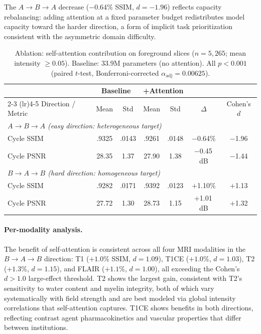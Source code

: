 \documentclass{article}
\begin{document}
The $A{\to}B{\to}A$ decrease ($-0.64\%$ SSIM, $d{=}{-}1.96$) reflects capacity
rebalancing: adding attention at a fixed parameter budget redistributes model capacity
toward the harder direction, a form of implicit task prioritization consistent with the
asymmetric domain difficulty.

\begin{table}[t]
  \centering
  \caption{Ablation: self-attention contribution on foreground slices ($n{=}5{,}265$;
    mean intensity $\geq 0.05$). Baseline: 33.9M parameters (no attention). All $p{<}0.001$
    (paired $t$-test, Bonferroni-corrected $\alpha_{\mathrm{adj}}{=}0.00625$).}
  \label{tab:ablation}
  \small
  \begin{tabular}{lcccccc}
    \toprule
    & \multicolumn{2}{c}{Baseline} & \multicolumn{2}{c}{+Attention} & & \\
    \cmidrule(lr){2-3} \cmidrule(lr){4-5}
    Direction / Metric & Mean & Std & Mean & Std & $\Delta$ & Cohen's $d$ \\
    \midrule
    \multicolumn{7}{l}{\textit{$A \to B \to A$ (easy direction: heterogeneous target)}} \\
    \quad Cycle SSIM & .9325 & .0143 & .9261 & .0148 & $-$0.64\% & $-$1.96 \\
    \quad Cycle PSNR & 28.35 & 1.37  & 27.90 & 1.38  & $-$0.45\,dB & $-$1.44 \\
    \midrule
    \multicolumn{7}{l}{\textit{$B \to A \to B$ (hard direction: homogeneous target)}} \\
    \quad Cycle SSIM & .9282 & .0171 & .9392 & .0123 & $+$1.10\% & $+$1.13 \\
    \quad Cycle PSNR & 27.72 & 1.30  & 28.73 & 1.15  & $+$1.01\,dB & $+$1.32 \\
    \bottomrule
  \end{tabular}
\end{table}

\paragraph{Per-modality analysis.}
The benefit of self-attention is consistent across all four MRI modalities in the
$B{\to}A{\to}B$ direction: T1 ($+1.0\%$ SSIM, $d{=}1.09$), T1CE ($+1.0\%$, $d{=}1.03$),
T2 ($+1.3\%$, $d{=}1.15$), and FLAIR ($+1.1\%$, $d{=}1.00$), all exceeding the
Cohen's $d > 1.0$ large-effect threshold. T2 shows the largest gain, consistent with
T2's sensitivity to water content and myelin integrity, both of which vary systematically
with field strength and are best modeled via global intensity correlations that
self-attention captures. T1CE shows benefits in both directions, reflecting contrast
agent pharmacokinetics and vascular properties that differ between institutions.
\end{document}
